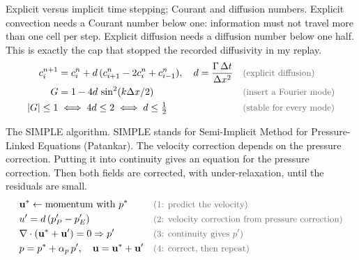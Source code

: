 \begin{qabox}{Explicit versus implicit time stepping; Courant and diffusion numbers.}
\explain Explicit convection needs a Courant number below one: information must not travel more
than one cell per step. Explicit diffusion needs a diffusion number below one half. This is exactly
the cap that stopped the recorded diffusivity in my replay.
\derive
\begin{align*}
c_i^{n+1} &= c_i^n + d\,(c_{i+1}^n - 2c_i^n + c_{i-1}^n),\quad d = \frac{\Gamma\,\Delta t}{\Delta x^2} \why{explicit diffusion} \\
G &= 1 - 4d\,\sin^2(k\Delta x/2) \why{insert a Fourier mode} \\
\lvert G\rvert \le 1 &\iff 4d \le 2 \iff d \le \tfrac12 \why{stable for every mode}
\end{align*}
\end{qabox}

\begin{qabox}{The SIMPLE algorithm.}
\explain SIMPLE stands for Semi-Implicit Method for Pressure-Linked Equations (Patankar). The
velocity correction depends on the pressure correction. Putting it into continuity gives an
equation for the pressure correction. Then both fields are corrected, with under-relaxation, until
the residuals are small.
\derive
\begin{align*}
&\mathbf{u}^{*} \leftarrow \text{momentum with } p^{*} \why{1: predict the velocity} \\
&u' = d\,(p'_P - p'_E) \why{2: velocity correction from pressure correction} \\
&\nabla\cdot(\mathbf{u}^{*} + \mathbf{u}') = 0 \Rightarrow p' \why{3: continuity gives $p'$} \\
&p = p^{*} + \alpha_p\,p',\quad \mathbf{u} = \mathbf{u}^{*} + \mathbf{u}' \why{4: correct, then repeat}
\end{align*}
\end{qabox}

